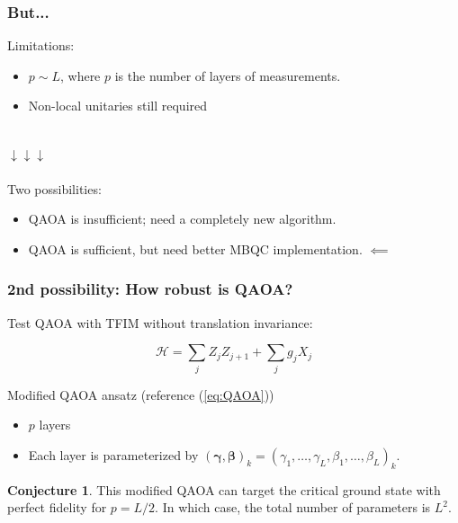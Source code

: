 \documentclass{beamer}
\theoremstyle{definition}
\newtheorem{conjecture}{Conjecture}[section]
\begin{document}


\begin{frame}
\frametitle{But...}
Limitations: 
\begin{itemize}
	\item $p \sim L$, where $p$ is the number of layers of measurements. 
	\item Non-local unitaries still required
\end{itemize}




$\,$\\
\pause
$\downarrow\downarrow\downarrow$\\

$\,$\\

Two possibilities:
\begin{itemize}
	\item QAOA is insufficient; need a completely new algorithm.
	\item QAOA is sufficient, but need better MBQC implementation. \pause $\impliedby$
\end{itemize} 



\end{frame}






\begin{frame}
\frametitle{2nd possibility: How robust is QAOA?}

Test QAOA with TFIM without translation invariance:

\begin{equation}\label{eq:QAOAmod}
\mathcal{H} = \sum_{j} Z_j Z_{j+1} + \sum_j g_j  X_j
\end{equation}

\pause

Modified QAOA ansatz (reference (\ref{eq:QAOA}))
\begin{itemize}
	\item $p$ layers
	\item Each layer is parameterized by $(\bm\gamma,\bm\beta)_k = (\gamma_{1},\dots,\gamma_{L},\beta_{1},\dots,\beta_{L} )_k$.
\end{itemize}

\pause

\begin{conjecture}
	This modified QAOA can target the critical ground state with perfect fidelity for $p = L/2$. In which case, the total number of parameters is $L^2$.  
\end{conjecture}




\end{frame}
\end{document}
